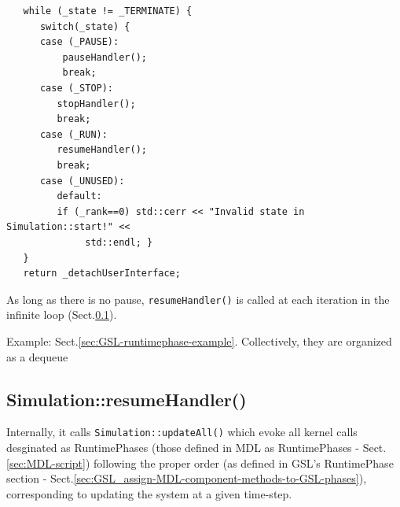 {\begin{lstlisting}
   while (_state != _TERMINATE) {
      switch(_state) {                                                                                        
      case (_PAUSE):                                                                                          
          pauseHandler();                                                                                          
          break;                                                                                                   
      case (_STOP):                                                                                           
         stopHandler();                                                                                           
         break;                                                                                                   
      case (_RUN):                                                                                            
         resumeHandler();                                                                                         
         break;                
      case (_UNUSED):                                                                                         
         default:                                                                                                
         if (_rank==0) std::cerr << "Invalid state in Simulation::start!" <<
              std::endl; }                                                                                                       
   }                                                                                                          
   return _detachUserInterface;                                                            
\end{lstlisting}
}

As long as there is no pause, \verb!resumeHandler()! is called at each
iteration in the infinite loop (Sect.\ref{sec:Simulation-resumeHandler()}).

Example: Sect.\ref{sec:GSL-runtimephase-example}. Collectively, they are
organized as a dequeue



\subsection{Simulation::resumeHandler()}
\label{sec:Simulation-resumeHandler()}

Internally, it calls \verb!Simulation::updateAll()! which evoke all kernel calls
desginated as RuntimePhases (those defined in MDL as RuntimePhases -
Sect.\ref{sec:MDL-script}) following the proper order (as defined in GSL's
RuntimePhase section -
Sect.\ref{sec:GSL_assign-MDL-component-methods-to-GSL-phases}), corresponding to
updating the system at a given time-step.

